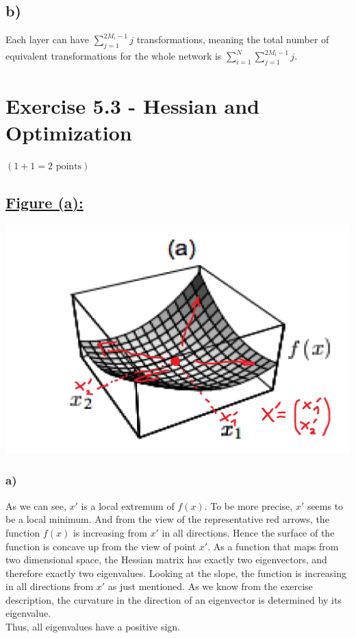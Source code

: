 \documentclass[a4paper]{article}
\begin{document}
    \subsection*{b)}
    Each layer can have $\sum_{j=1}^{2M_i-1}j$ transformations, meaning the total number of equivalent transformations for the whole network is $\sum_{i=1}^{N}\sum_{j=1}^{2M_i-1}j$.
        



\newpage
\section*{Exercise 5.3 - Hessian and Optimization}
$(1+1 = 2 \text{ points})$
    \subsection*{\underline{Figure (a):}}
        \includegraphics[width=0.8\linewidth]{Assignment 5/1.png}
        \subsubsection*{a)}
            As we can see, $x'$ is a local extremum of $f(x)$. To be more precise, $x'$ seems to be a local minimum.
            And from the view of the representative red arrows, the function $f(x)$ is increasing from $x'$ in all directions.
            Hence the surface of the function is concave up from the view of point $x'$.
            As a function that maps from two dimensional space, the Hessian matrix has exactly two eigenvectors, and therefore exactly two eigenvalues.
            Looking at the slope, the function is increasing in all directions from $x'$ as just mentioned.
            As we know from the exercise description, the curvature in the direction of an eigenvector is determined by its eigenvalue.\\
            Thus, all eigenvalues have a positive sign.
\end{document}
